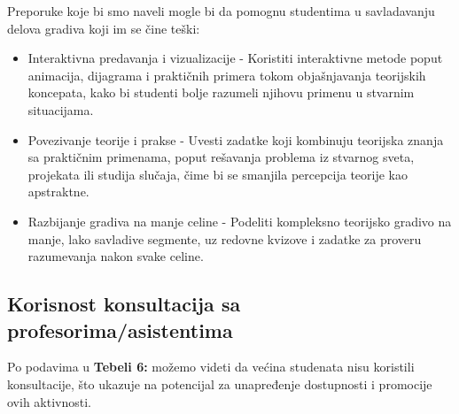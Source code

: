 \documentclass[a4paper]{article}
\begin{document}
\captionsetup[table]{skip=10pt}
\begin{table}[H]
\centering %
\caption{Savladavanje teorijskih, odnosno praktičnih delova gradiva}
\end{table}

Preporuke koje bi smo naveli mogle bi da pomognu studentima u savladavanju delova gradiva koji im se čine teški:  \\

\begin{itemize}
    \item Interaktivna predavanja i vizualizacije - Koristiti interaktivne metode poput animacija, dijagrama i praktičnih primera tokom objašnjavanja teorijskih koncepata, kako bi studenti bolje razumeli njihovu primenu u stvarnim situacijama.
    \item Povezivanje teorije i prakse - Uvesti zadatke koji kombinuju teorijska znanja sa praktičnim primenama, poput rešavanja problema iz stvarnog sveta, projekata ili studija slučaja, čime bi se smanjila percepcija teorije kao apstraktne.
    \item Razbijanje gradiva na manje celine - Podeliti kompleksno teorijsko gradivo na manje, lako savladive segmente, uz redovne kvizove i zadatke za proveru razumevanja nakon svake celine.\\
\end{itemize}

\subsection{\textbf{Korisnost konsultacija sa profesorima/asistentima} }

Po podavima u \textbf{Tebeli 6:} možemo videti da većina studenata nisu koristili konsultacije, što ukazuje na potencijal za unapređenje dostupnosti i promocije ovih aktivnosti.\\
\end{document}
